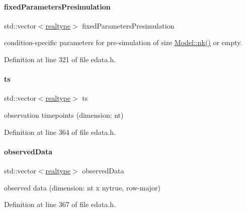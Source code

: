 \paragraph{\texorpdfstring{fixed\+Parameters\+Presimulation}{fixedParametersPresimulation}}
{\footnotesize\ttfamily std\+::vector$<$\mbox{\hyperlink{namespaceamici_a1bdce28051d6a53868f7ccbf5f2c14a3}{realtype}}$>$ fixed\+Parameters\+Presimulation}

condition-\/specific parameters for pre-\/simulation of size \mbox{\hyperlink{classamici_1_1_model_a3d4130da64883565a06a86e7d6029da1}{Model\+::nk()}} or empty. 

Definition at line 321 of file edata.\+h.

\mbox{\label{classamici_1_1_exp_data_aa7014a80e7b102f85a10e3b9a480e8e5}} 
\paragraph{\texorpdfstring{ts}{ts}}
{\footnotesize\ttfamily std\+::vector$<$\mbox{\hyperlink{namespaceamici_a1bdce28051d6a53868f7ccbf5f2c14a3}{realtype}}$>$ ts\hspace{0.3cm}{\ttfamily [protected]}}

observation timepoints (dimension\+: nt) 

Definition at line 364 of file edata.\+h.

\mbox{\label{classamici_1_1_exp_data_a6acedf749a3c5e4c4dcbc822f58a565d}} 
\paragraph{\texorpdfstring{observed\+Data}{observedData}}
{\footnotesize\ttfamily std\+::vector$<$\mbox{\hyperlink{namespaceamici_a1bdce28051d6a53868f7ccbf5f2c14a3}{realtype}}$>$ observed\+Data\hspace{0.3cm}{\ttfamily [protected]}}

observed data (dimension\+: nt x nytrue, row-\/major) 

Definition at line 367 of file edata.\+h.

\mbox{\label{classamici_1_1_exp_data_aa097568cebb4be48c4c1dfaab0c2a159}} 
